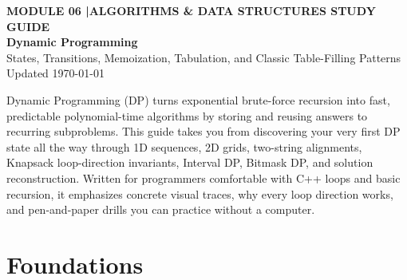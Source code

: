 \documentclass[11pt,a4paper]{article}
\newcommand{\sectionbreak}{}
\theoremstyle{definition}
\begin{document}
\thispagestyle{plain}
\begin{tcolorbox}[
    enhanced,
    colback=primaryblue!6, colframe=primaryblue!20,
    borderline west={5pt}{0pt}{primaryblue},
    arc=4pt, boxrule=0.6pt,
    left=14pt, right=14pt, top=7pt, bottom=7pt,
    before skip=0pt, after skip=5pt
]
    {\footnotesize\bfseries\color{accentteal}MODULE 06 \quad|\quad ALGORITHMS \& DATA STRUCTURES STUDY GUIDE}\\[3pt]
    {\Huge\bfseries\color{primaryblue}Dynamic Programming}\\[3pt]
    {\large\color{codegray}States, Transitions, Memoization, Tabulation, and Classic Table-Filling Patterns}\\[4pt]
    {\footnotesize\color{codegray}Updated \today}
\end{tcolorbox}

\begin{overviewbox}
{\small Dynamic Programming (DP) turns exponential brute-force recursion into fast, predictable polynomial-time algorithms by storing and reusing answers to recurring subproblems. This guide takes you from discovering your very first DP state all the way through 1D sequences, 2D grids, two-string alignments, Knapsack loop-direction invariants, Interval DP, Bitmask DP, and solution reconstruction. Written for programmers comfortable with C++ loops and basic recursion, it emphasizes concrete visual traces, why every loop direction works, and pen-and-paper drills you can practice without a computer.}
\end{overviewbox}

\vspace{-6pt}
{\setlength{\parskip}{0pt}\footnotesize
\titlespacing*{\section}{0pt}{2pt}{6pt}%
\makeatletter
\let\lm@orig@addvspace\addvspace
\renewcommand{\addvspace}[1]{\lm@orig@addvspace{0.20em plus 1pt}}
\makeatother
\tableofcontents}

\renewcommand{\sectionbreak}{\clearpage}

\section{Foundations}
\end{document}
